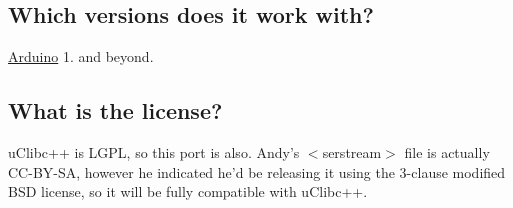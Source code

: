 \subsection*{Which versions does it work with?}

\hyperlink{struct_arduino}{Arduino} 1. and beyond.

\subsection*{What is the license?}

u\-Clibc++ is L\-G\-P\-L, so this port is also. Andy's $<$serstream$>$ file is actually C\-C-\/\-B\-Y-\/\-S\-A, however he indicated he'd be releasing it using the 3-\/clause modified B\-S\-D license, so it will be fully compatible with u\-Clibc++. 